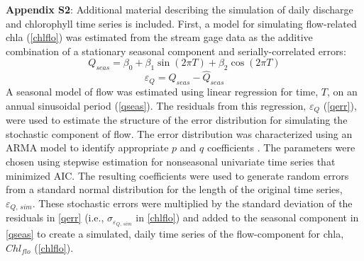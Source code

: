 \documentclass[letterpaper,12pt,oneside]{article}\usepackage[]{graphicx}\usepackage[]{color}
\begin{document}
{\bf Appendix S2}: Additional material describing the simulation of daily discharge and chlorophyll time series is included. 
First, a model for simulating flow-related \ac{chla} (\cref{chlflo}) was estimated from the stream gage data as the additive combination of a stationary seasonal component and serially-correlated errors:
\begin{equation} \label{qseas}
Q_{seas} = \beta_0 + \beta_1 \sin\left(2\pi T\right) + \beta_2 \cos\left(2\pi T\right)
\end{equation}
\begin{equation} \label{qerr}
\varepsilon_{Q} = Q_{seas} - \widehat{Q}_{seas}
\end{equation}
A seasonal model of flow was estimated using linear regression for time, $T$, on an annual sinusoidal period (\cref{qseas}).  The residuals from this regression, $\varepsilon_{Q}$ (\cref{qerr}), were used to estimate the structure of the error distribution for simulating the stochastic component of flow.  The error distribution was characterized using an \ac{ARMA} model to identify appropriate $p$ and $q$ coefficients \citep{Hyndman08}.  The parameters were chosen using stepwise estimation for nonseasonal univariate time series that minimized \ac{AIC}.  The resulting coefficients were used to generate random errors from a standard normal distribution for the length of the original time series, $\varepsilon_{Q,\,sim}$.  These stochastic errors were multiplied by the standard deviation of the residuals in \cref{qerr} (i.e., $\sigma_{\varepsilon_{Q,\,sim}}$ in \cref{chlflo}) and added to the seasonal component in \cref{qseas} to create a simulated, daily time series of the flow-component for \ac{chla}, $Chl_{flo}$ (\cref{chlflo}).
\end{document}
